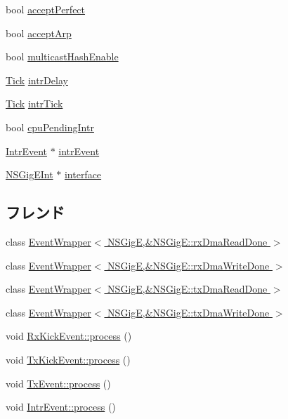 \begin{DoxyCompactItemize}
\item 
bool \hyperlink{classNSGigE_a087fcc726da17dd517767d457f79e09e}{acceptPerfect}
\item 
bool \hyperlink{classNSGigE_aa19a3e066f9b2809cc5ffc31662a6461}{acceptArp}
\item 
bool \hyperlink{classNSGigE_aa1683e2194fe1e3d86d920be942f7b16}{multicastHashEnable}
\item 
\hyperlink{base_2types_8hh_a5c8ed81b7d238c9083e1037ba6d61643}{Tick} \hyperlink{classNSGigE_a2c0cc3d9993d1f77cdb0902bc5e257a9}{intrDelay}
\item 
\hyperlink{base_2types_8hh_a5c8ed81b7d238c9083e1037ba6d61643}{Tick} \hyperlink{classNSGigE_ad967cc729c22843df7961315b2fdab72}{intrTick}
\item 
bool \hyperlink{classNSGigE_aa3e6b7b45f86d3fcd5565d6c960dbfa7}{cpuPendingIntr}
\item 
\hyperlink{classEventWrapper}{IntrEvent} $\ast$ \hyperlink{classNSGigE_a3839fcc574c7379ba7ec297aba0396e2}{intrEvent}
\item 
\hyperlink{classNSGigEInt}{NSGigEInt} $\ast$ \hyperlink{classNSGigE_a16e4d8bb1104f710924176c08342141f}{interface}
\end{DoxyCompactItemize}
\subsection*{フレンド}
\begin{DoxyCompactItemize}
\item 
class \hyperlink{classNSGigE_a9083f04a844562a571970a4131595f10}{EventWrapper$<$ NSGigE,\&NSGigE::rxDmaReadDone $>$}
\item 
class \hyperlink{classNSGigE_a5db27c2ad623ba37b7f2955add28d2c9}{EventWrapper$<$ NSGigE,\&NSGigE::rxDmaWriteDone $>$}
\item 
class \hyperlink{classNSGigE_ac60c9effddbf6253e8050f4218df6890}{EventWrapper$<$ NSGigE,\&NSGigE::txDmaReadDone $>$}
\item 
class \hyperlink{classNSGigE_a85cb28e6a02ebd2375205fb51a972db4}{EventWrapper$<$ NSGigE,\&NSGigE::txDmaWriteDone $>$}
\item 
void \hyperlink{classNSGigE_a97dc465a9dffe1cb8fcb2775d67610ca}{RxKickEvent::process} ()
\item 
void \hyperlink{classNSGigE_ab1e1e9de6b0b4cbeee1a4c0bb61e07d9}{TxKickEvent::process} ()
\item 
void \hyperlink{classNSGigE_ac669bd618effa3395173bc2905568d54}{TxEvent::process} ()
\item 
void \hyperlink{classNSGigE_ae03991571cb7e9ffd0046e10275338fb}{IntrEvent::process} ()
\end{DoxyCompactItemize}


